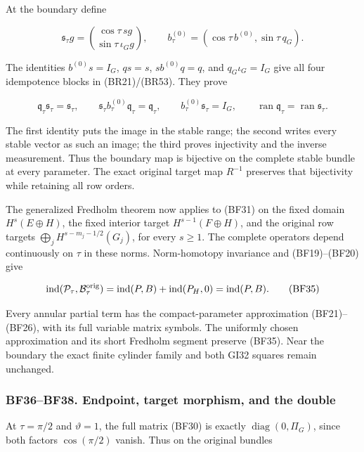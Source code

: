 \documentclass[
  11pt,
]{article}
\begin{document}
At the boundary define

\[
 \mathfrak s_\tau g=
   \binom{\cos\tau\,sg}{\sin\tau\,\iota_Gg},\qquad
 b_\tau^{(0)}=(\cos\tau\,b^{(0)},\sin\tau\,q_G).
 \tag{BF33}
\]

The identities \(b^{(0)}s=I_G\), \(qs=s\), \(sb^{(0)}q=q\), and
\(q_G\iota_G=I_G\) give all four idempotence blocks in (BR21)/(BR53).
They prove

\[
 \mathfrak q_\tau\mathfrak s_\tau=\mathfrak s_\tau,
 \qquad \mathfrak s_\tau b_\tau^{(0)}\mathfrak q_\tau=\mathfrak q_\tau,
 \qquad b_\tau^{(0)}\mathfrak s_\tau=I_G,
 \qquad \operatorname{ran}\mathfrak q_\tau
          =\operatorname{ran}\mathfrak s_\tau.
 \tag{BF34}
\]

The first identity puts the image in the stable range; the second writes
every stable vector as such an image; the third proves injectivity and
the inverse measurement. Thus the boundary map is bijective on the
complete stable bundle at every parameter. The exact original target map
\(R^{-1}\) preserves that bijectivity while retaining all row orders.

The generalized Fredholm theorem now applies to (BF31) on the fixed
domain \(H^s(E\oplus H)\), the fixed interior target
\(H^{s-1}(F\oplus H)\), and the original row targets
\(\bigoplus_jH^{s-m_j-1/2}(G_j)\), for every \(s\ge1\). The complete
operators depend continuously on \(\tau\) in these norms. Norm-homotopy
invariance and (BF19)--(BF20) give

\[
 \operatorname{ind}(\mathcal P_\tau,\mathcal B_\tau^{\rm orig})
   =\operatorname{ind}(P,B)+\operatorname{ind}(P_H,0)
   =\operatorname{ind}(P,B).
 \tag{BF35}
\]

Every annular partial term has the compact-parameter approximation
(BF21)--(BF26), with its full variable matrix symbols. The uniformly
chosen approximation and its short Fredholm segment preserve (BF35).
Near the boundary the exact finite cylinder family and both GI32 squares
remain unchanged.

\subsubsection{BF36--BF38. Endpoint, target morphism, and the
double}\label{bf36bf38.-endpoint-target-morphism-and-the-double}

At \(\tau=\pi/2\) and \(\vartheta=1\), the full matrix (BF30) is exactly
\(\operatorname{diag}(0,\Pi_G)\), since both factors \(\cos(\pi/2)\)
vanish. Thus on the original bundles
\end{document}
